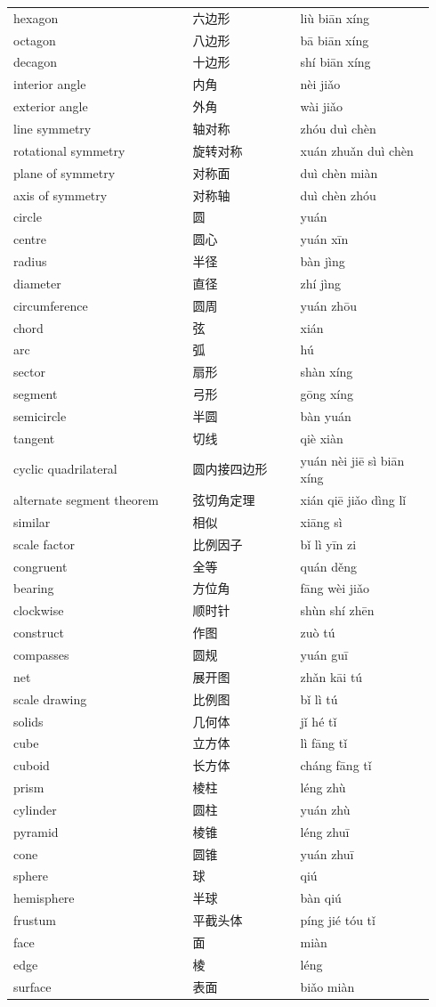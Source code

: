 \documentclass[11pt]{article}
\begin{document}
\begin{longtable}{@{}p{0.40\linewidth}p{0.24\linewidth}p{0.30\linewidth}@{}}
hexagon & 六边形 & liù biān xíng \\
octagon & 八边形 & bā biān xíng \\
decagon & 十边形 & shí biān xíng \\
interior angle & 内角 & nèi jiǎo \\
exterior angle & 外角 & wài jiǎo \\
line symmetry & 轴对称 & zhóu duì chèn \\
rotational symmetry & 旋转对称 & xuán zhuǎn duì chèn \\
plane of symmetry & 对称面 & duì chèn miàn \\
axis of symmetry & 对称轴 & duì chèn zhóu \\
circle & 圆 & yuán \\
centre & 圆心 & yuán xīn \\
radius & 半径 & bàn jìng \\
diameter & 直径 & zhí jìng \\
circumference & 圆周 & yuán zhōu \\
chord & 弦 & xián \\
arc & 弧 & hú \\
sector & 扇形 & shàn xíng \\
segment & 弓形 & gōng xíng \\
semicircle & 半圆 & bàn yuán \\
tangent & 切线 & qiè xiàn \\
cyclic quadrilateral & 圆内接四边形 & yuán nèi jiē sì biān xíng \\
alternate segment theorem & 弦切角定理 & xián qiē jiǎo dìng lǐ \\
similar & 相似 & xiāng sì \\
scale factor & 比例因子 & bǐ lì yīn zi \\
congruent & 全等 & quán děng \\
bearing & 方位角 & fāng wèi jiǎo \\
clockwise & 顺时针 & shùn shí zhēn \\
construct & 作图 & zuò tú \\
compasses & 圆规 & yuán guī \\
net & 展开图 & zhǎn kāi tú \\
scale drawing & 比例图 & bǐ lì tú \\
solids & 几何体 & jǐ hé tǐ \\
cube & 立方体 & lì fāng tǐ \\
cuboid & 长方体 & cháng fāng tǐ \\
prism & 棱柱 & léng zhù \\
cylinder & 圆柱 & yuán zhù \\
pyramid & 棱锥 & léng zhuī \\
cone & 圆锥 & yuán zhuī \\
sphere & 球 & qiú \\
hemisphere & 半球 & bàn qiú \\
frustum & 平截头体 & píng jié tóu tǐ \\
face & 面 & miàn \\
edge & 棱 & léng \\
surface & 表面 & biǎo miàn \\
\end{longtable}
\end{document}
